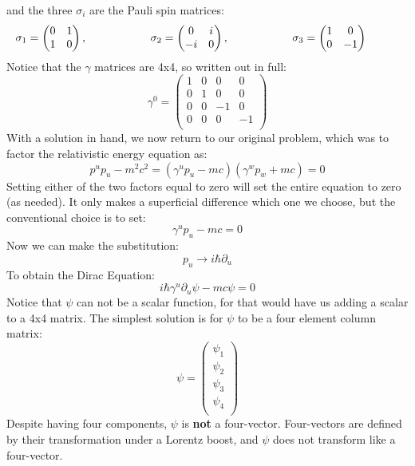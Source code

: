 \documentclass[12pt]{book}
\begin{document}
and the three $\sigma_i$ are the Pauli spin matrices:
$$\sigma_1 = \begin{pmatrix} 0 & 1 \\ 1 & 0 \end{pmatrix}, \hspace{2cm}
\sigma_2 = \begin{pmatrix} 0 & i \\ -i & 0 \end{pmatrix}, \hspace{2cm}
\sigma_3 = \begin{pmatrix} 1 & 0 \\ 0 & -1 \end{pmatrix}\\
\hspace{1cm} 
$$
Notice that the $\gamma$ matrices are 4x4, so written out in full:
$$\gamma^0 = \begin{pmatrix} 
1 & 0 & 0 & 0 \\ 
0 & 1 & 0 & 0 \\ 
0 & 0 &-1 & 0 \\ 
0 & 0 & 0 &-1 \\ 
\end{pmatrix}$$
With a solution in hand, we now return to our original problem, which was to factor the relativistic energy equation as:
$$p^up_u-m^2c^2 = \left( \gamma^u p_u - mc \right) \left( \gamma^w p_w + mc \right) = 0$$
Setting either of the two factors equal to zero will set the entire equation to zero (as needed).  It only makes a superficial difference which one we choose, but the conventional choice is to set:
$$\gamma^u p_u - mc = 0$$
Now we can make the substitution:
$$p_u \to i \hbar \partial_u$$
To obtain the Dirac Equation:
\begin{equation}
\label{eqn:dirac}
i\hbar\gamma^u\partial_u \psi - mc \psi = 0
\end{equation}
Notice that $\psi$ can not be a scalar function, for that would have us adding a scalar to a 4x4 matrix.  The simplest solution is for $\psi$ to be a four element column matrix:
$$\psi = \begin{pmatrix} \psi_1 \\ \psi_2 \\ \psi_3 \\ \psi_4 \\ \end{pmatrix}$$
Despite having four components, $\psi$ is {\bf not} a four-vector.  Four-vectors are defined by their transformation under a Lorentz boost, and $\psi$ does not transform like a four-vector.
\end{document}
